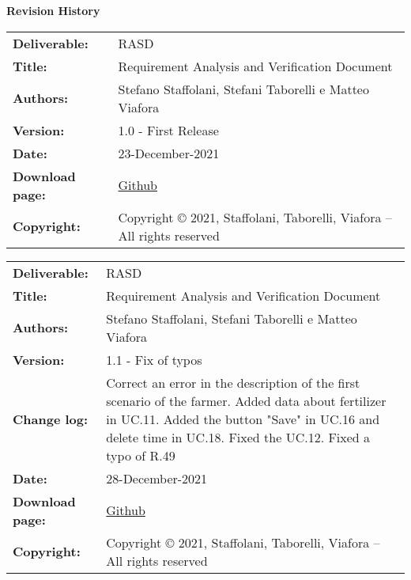 \textbf{Revision History}
\begin{table}[h!]
\begin{tabu} to \textwidth { X[0.3,r,p] X[0.7,l,p] }
\hline

\textbf{Deliverable:} & RASD\\
\textbf{Title:} & Requirement Analysis and Verification Document \\
\textbf{Authors:} & Stefano Staffolani, Stefani Taborelli e Matteo Viafora \\
\textbf{Version:} & 1.0 - First Release \\ 
\textbf{Date:} & 23-December-2021 \\
\textbf{Download page:} & \href{https://github.com/ViaforaMatteo/StaffolaniTaborelliViafora}{Github} \\
\textbf{Copyright:} & Copyright © 2021, Staffolani, Taborelli, Viafora – All rights reserved \\
\hline
\end{tabu}
\end{table}

\begin{table}[h!]
\begin{tabu} to \textwidth { X[0.3,r,p] X[0.7,l,p] }
\hline

\textbf{Deliverable:} & RASD\\
\textbf{Title:} & Requirement Analysis and Verification Document \\
\textbf{Authors:} & Stefano Staffolani, Stefani Taborelli e Matteo Viafora \\
\textbf{Version:} & 1.1 - Fix of typos\\ 
\textbf{Change log:} & Correct an error in the description of the first scenario of the farmer. Added data about fertilizer in UC.11. Added the button "Save" in UC.16 and delete time in UC.18. Fixed the UC.12. Fixed a typo of R.49\\
\textbf{Date:} & 28-December-2021 \\
\textbf{Download page:} & \href{https://github.com/ViaforaMatteo/StaffolaniTaborelliViafora}{Github} \\
\textbf{Copyright:} & Copyright © 2021, Staffolani, Taborelli, Viafora – All rights reserved \\
\hline
\end{tabu}
\end{table}